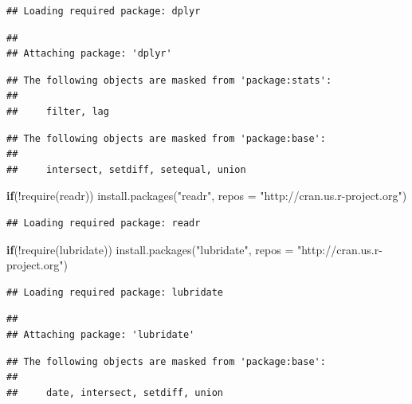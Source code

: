 \documentclass[
]{article}
\newenvironment{Shaded}{}{}
\newcommand{\AttributeTok}[1]{\textcolor[rgb]{0.49,0.56,0.16}{#1}}
\newcommand{\ControlFlowTok}[1]{\textcolor[rgb]{0.00,0.44,0.13}{\textbf{#1}}}
\newcommand{\FunctionTok}[1]{\textcolor[rgb]{0.02,0.16,0.49}{#1}}
\newcommand{\NormalTok}[1]{#1}
\newcommand{\SpecialCharTok}[1]{\textcolor[rgb]{0.25,0.44,0.63}{#1}}
\newcommand{\StringTok}[1]{\textcolor[rgb]{0.25,0.44,0.63}{#1}}
\begin{document}
\begin{verbatim}
## Loading required package: dplyr
\end{verbatim}

\begin{verbatim}
## 
## Attaching package: 'dplyr'
\end{verbatim}

\begin{verbatim}
## The following objects are masked from 'package:stats':
## 
##     filter, lag
\end{verbatim}

\begin{verbatim}
## The following objects are masked from 'package:base':
## 
##     intersect, setdiff, setequal, union
\end{verbatim}

\begin{Shaded}
\begin{Highlighting}[]
\ControlFlowTok{if}\NormalTok{(}\SpecialCharTok{!}\FunctionTok{require}\NormalTok{(readr)) }\FunctionTok{install.packages}\NormalTok{(}\StringTok{"readr"}\NormalTok{, }
                                     \AttributeTok{repos =} \StringTok{"http://cran.us.r{-}project.org"}\NormalTok{)}
\end{Highlighting}
\end{Shaded}

\begin{verbatim}
## Loading required package: readr
\end{verbatim}

\begin{Shaded}
\begin{Highlighting}[]
\ControlFlowTok{if}\NormalTok{(}\SpecialCharTok{!}\FunctionTok{require}\NormalTok{(lubridate)) }\FunctionTok{install.packages}\NormalTok{(}\StringTok{"lubridate"}\NormalTok{, }
                                     \AttributeTok{repos =} \StringTok{"http://cran.us.r{-}project.org"}\NormalTok{)}
\end{Highlighting}
\end{Shaded}

\begin{verbatim}
## Loading required package: lubridate
\end{verbatim}

\begin{verbatim}
## 
## Attaching package: 'lubridate'
\end{verbatim}

\begin{verbatim}
## The following objects are masked from 'package:base':
## 
##     date, intersect, setdiff, union
\end{verbatim}
\end{document}
